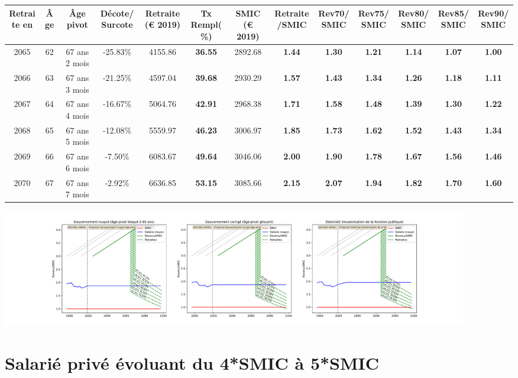 { \scriptsize \begin{center} 
\begin{tabular}[htb]{|c|c||c|c||c|c||c||c|c|c|c|c|c|} 
\hline 
 Retraite en &  Âge &  Âge pivot &  Décote/Surcote &  Retraite (\euro{} 2019) &  Tx Rempl(\%) &  SMIC (\euro{} 2019) &  Retraite/SMIC &  Rev70/SMIC &  Rev75/SMIC &  Rev80/SMIC &  Rev85/SMIC &  Rev90/SMIC \\ 
\hline \hline 
 2065 &  62 &  67 ans 2 mois &  -25.83\% &  4155.86 &  {\bf 36.55} &  2892.68 &  {\bf 1.44} &  {\bf 1.30} &  {\bf 1.21} &  {\bf 1.14} &  {\bf 1.07} &  {\bf 1.00} \\ 
\hline 
 2066 &  63 &  67 ans 3 mois &  -21.25\% &  4597.04 &  {\bf 39.68} &  2930.29 &  {\bf 1.57} &  {\bf 1.43} &  {\bf 1.34} &  {\bf 1.26} &  {\bf 1.18} &  {\bf 1.11} \\ 
\hline 
 2067 &  64 &  67 ans 4 mois &  -16.67\% &  5064.76 &  {\bf 42.91} &  2968.38 &  {\bf 1.71} &  {\bf 1.58} &  {\bf 1.48} &  {\bf 1.39} &  {\bf 1.30} &  {\bf 1.22} \\ 
\hline 
 2068 &  65 &  67 ans 5 mois &  -12.08\% &  5559.97 &  {\bf 46.23} &  3006.97 &  {\bf 1.85} &  {\bf 1.73} &  {\bf 1.62} &  {\bf 1.52} &  {\bf 1.43} &  {\bf 1.34} \\ 
\hline 
 2069 &  66 &  67 ans 6 mois &  -7.50\% &  6083.67 &  {\bf 49.64} &  3046.06 &  {\bf 2.00} &  {\bf 1.90} &  {\bf 1.78} &  {\bf 1.67} &  {\bf 1.56} &  {\bf 1.46} \\ 
\hline 
 2070 &  67 &  67 ans 7 mois &  -2.92\% &  6636.85 &  {\bf 53.15} &  3085.66 &  {\bf 2.15} &  {\bf 2.07} &  {\bf 1.94} &  {\bf 1.82} &  {\bf 1.70} &  {\bf 1.60} \\ 
\hline 
\hline 
\end{tabular} 
\end{center} } 

 \begin{center}\includegraphics[width=0.9\textwidth]{fig/Ascendant34_2003_22_dest_retraite.pdf}\end{center} \label{fig/Ascendant34_2003_22_dest_retraite.pdf} 

\newpage 
 
\chapter{Salarié privé évoluant du 4*SMIC à 5*SMIC} 


